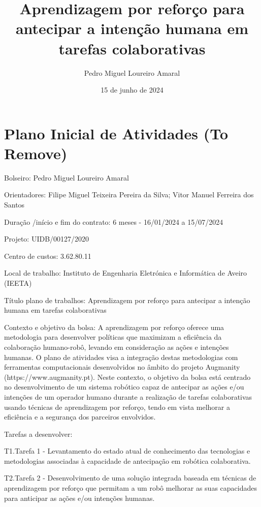 \documentclass[a4paper]{report}
\title{Aprendizagem por reforço para antecipar a intenção humana em tarefas colaborativas}
\author{Pedro Miguel Loureiro Amaral}
\date{15 de junho de 2024}
\begin{document}
\maketitle

\renewcommand\thesection{\arabic{section}}







\color{red}

\section{Plano Inicial de Atividades (To Remove)}

Bolseiro: Pedro Miguel Loureiro Amaral

Orientadores: Filipe Miguel Teixeira Pereira da Silva; Vitor Manuel Ferreira dos Santos

Duração /início e fim do contrato: 6 meses - 16/01/2024 a 15/07/2024

Projeto: UIDB/00127/2020

Centro de custos: 3.62.80.11

Local de trabalho: Instituto de Engenharia Eletrónica e Informática de Aveiro (IEETA)

Título plano de trabalhos: Aprendizagem por reforço para antecipar a intenção humana em tarefas colaborativas

Contexto e objetivo da bolsa: A aprendizagem por reforço oferece uma metodologia para desenvolver políticas que maximizam a eficiência da colaboração humano-robô, levando em consideração as ações e intenções humanas. O plano de atividades visa a integração destas metodologias com ferramentas computacionais desenvolvidos no âmbito do projeto Augmanity (https://www.augmanity.pt). Neste contexto, o objetivo da bolsa está centrado no desenvolvimento de um sistema robótico capaz de antecipar as ações e/ou intenções de um operador humano durante a realização de tarefas colaborativas usando técnicas de aprendizagem por reforço, tendo em vista melhorar a eficiência e a segurança dos parceiros envolvidos.

Tarefas a desenvolver:

T1.Tarefa 1 - Levantamento do estado atual de conhecimento das tecnologias e metodologias associadas à capacidade de antecipação em robótica colaborativa.

T2.Tarefa 2 - Desenvolvimento de uma solução integrada baseada em técnicas de aprendizagem por reforço que permitam a um robô melhorar as suas capacidades para anticipar as ações e/ou intenções humanas.
\end{document}
